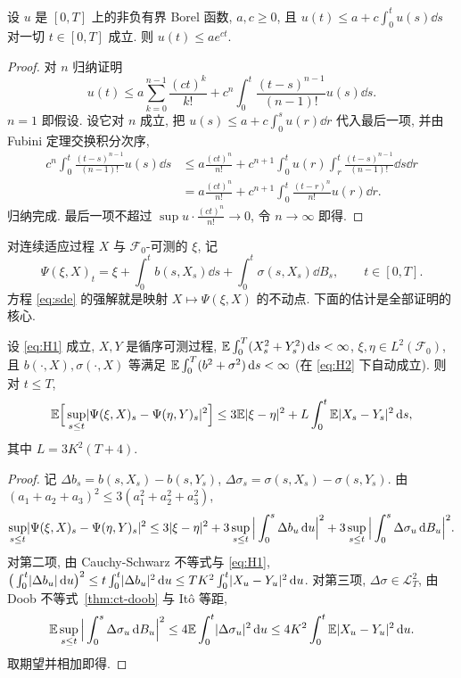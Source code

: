 \begin{lemma}\label{lem:gronwall}
设 $u$ 是 $[0,T]$ 上的非负有界 Borel 函数, $a,c\ge0$, 且 $u(t)\le a+c\int_0^tu(s)\dd s$ 对一切 $t\in[0,T]$ 成立. 则 $u(t)\le ae^{ct}$.
\end{lemma}

\begin{proof}
对 $n$ 归纳证明
\[
u(t)\le a\sum_{k=0}^{n-1}\frac{(ct)^k}{k!}+c^n\int_0^t\frac{(t-s)^{n-1}}{(n-1)!}u(s)\dd s.
\]
$n=1$ 即假设. 设它对 $n$ 成立, 把 $u(s)\le a+c\int_0^su(r)\dd r$ 代入最后一项, 并由 Fubini 定理交换积分次序,
\begin{align*}
c^n\int_0^t\frac{(t-s)^{n-1}}{(n-1)!}u(s)\dd s&\le a\frac{(ct)^n}{n!}+c^{n+1}\int_0^tu(r)\int_r^t\frac{(t-s)^{n-1}}{(n-1)!}\dd s\dd r\\
&=a\frac{(ct)^n}{n!}+c^{n+1}\int_0^t\frac{(t-r)^n}{n!}u(r)\dd r.
\end{align*}
归纳完成. 最后一项不超过 $\sup u\cdot\frac{(ct)^n}{n!}\to0$, 令 $n\to\infty$ 即得.
\end{proof}

对连续适应过程 $X$ 与 $\mathcal{F}_0$-可测的 $\xi$, 记
\[
\Psi(\xi,X)_t=\xi+\int_0^tb(s,X_s)\dd s+\int_0^t\sigma(s,X_s)\dd B_s,\qquad t\in[0,T].
\]
方程 \eqref{eq:sde} 的强解就是映射 $X\mapsto\Psi(\xi,X)$ 的不动点. 下面的估计是全部证明的核心.

\begin{lemma}[基本估计]\label{lem:sde-estimate}
设 \eqref{eq:H1} 成立, $X,Y$ 是循序可测过程, $\mathbb{E}\int_0^T(X_s^2+Y_s^2)\mathop{}\!\mathrm{d} s<\infty$, $\xi,\eta\in L^2(\mathcal{F}_0)$, 且 $b(\cdot,X),\sigma(\cdot,X)$ 等满足 $\mathbb{E}\int_0^T(b^2+\sigma^2)\mathop{}\!\mathrm{d} s<\infty$ (在 \eqref{eq:H2} 下自动成立). 则对 $t\le T$,
\[
\mathbb{E}\Big[\sup_{s\le t}\lvert\Psi(\xi,X)_s-\Psi(\eta,Y)_s\rvert^2\Big]\le3\mathbb{E}\lvert\xi-\eta\rvert^2+L\int_0^t\mathbb{E}\lvert X_s-Y_s\rvert^2\mathop{}\!\mathrm{d} s,
\]
其中 $L=3K^2(T+4)$.
\end{lemma}

\begin{proof}
记 $\Delta b_s=b(s,X_s)-b(s,Y_s)$, $\Delta\sigma_s=\sigma(s,X_s)-\sigma(s,Y_s)$. 由 $(a_1+a_2+a_3)^2\le3(a_1^2+a_2^2+a_3^2)$,
\[
\sup_{s\le t}\lvert\Psi(\xi,X)_s-\Psi(\eta,Y)_s\rvert^2\le3\lvert\xi-\eta\rvert^2+3\sup_{s\le t}\Big\lvert\int_0^s\Delta b_u\mathop{}\!\mathrm{d} u\Big\rvert^2+3\sup_{s\le t}\Big\lvert\int_0^s\Delta\sigma_u\mathop{}\!\mathrm{d} B_u\Big\rvert^2.
\]
对第二项, 由 Cauchy-Schwarz 不等式与 \eqref{eq:H1}, $\big(\int_0^t\lvert\Delta b_u\rvert\mathop{}\!\mathrm{d} u\big)^2\le t\int_0^t\lvert\Delta b_u\rvert^2\mathop{}\!\mathrm{d} u\le TK^2\int_0^t\lvert X_u-Y_u\rvert^2\mathop{}\!\mathrm{d} u$. 对第三项, $\Delta\sigma\in\mathscr{L}^2_T$, 由 Doob 不等式~\ref{thm:ct-doob} 与 It\^o 等距,
\[
\mathbb{E}\sup_{s\le t}\Big\lvert\int_0^s\Delta\sigma_u\mathop{}\!\mathrm{d} B_u\Big\rvert^2\le4\mathbb{E}\int_0^t\lvert\Delta\sigma_u\rvert^2\mathop{}\!\mathrm{d} u\le4K^2\int_0^t\mathbb{E}\lvert X_u-Y_u\rvert^2\mathop{}\!\mathrm{d} u.
\]
取期望并相加即得.
\end{proof}


